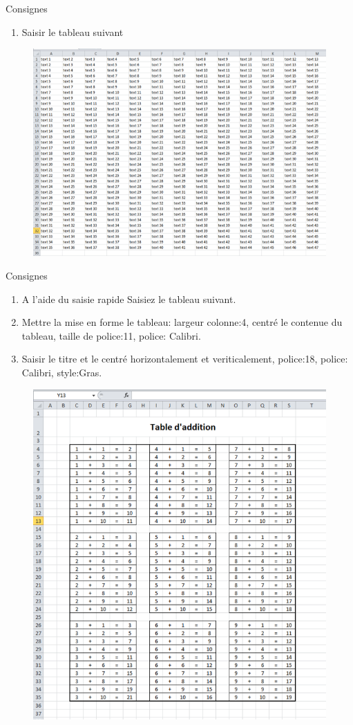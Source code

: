 \begin{exercice}\label{ex5}
	Consignes 
	\begin{enumerate}		
		\item  Saisir  le tableau suivant		
	\end{enumerate}
\end{exercice}  
\begin{figure} [H]  
	\centering
	\includegraphics[scale=0.2,width= \linewidth]{img/ex05} 
\end{figure}
\begin{exercice}\label{ex6}
	Consignes 
	\begin{enumerate}		
		\item  A l'aide du saisie rapide Saisiez le tableau suivant.  				
		\item  Mettre la mise en forme le tableau: largeur colonne:4, centré le contenue du tableau, taille de police:11, police: Calibri.				
		\item  Saisir le titre et le centré horizontalement et veriticalement, police:18, police: Calibri, style:Gras.
	\end{enumerate}	
\end{exercice}
\begin{figure}[H]
	\centering
	\includegraphics[scale=0.2,width=0.7 \linewidth]{img/ex06}
\end{figure}


